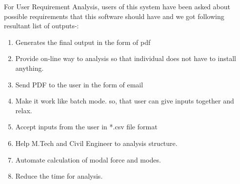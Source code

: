For User Requirement Analysis, users of this system have been asked about 
possible requirements that this software should have and we got following
resultant list of outputs-:
\begin{enumerate}
\item Generates the final output in the form of pdf
\item Provide on-line way to analysis so that individual does not have to 
install anything.
\item Send PDF to the user in the form of email
\item Make it work like batch mode. so, that user can give inputs 
together and relax.
\item Accept inputs from the user in *.csv file format
\item Help M.Tech and Civil Engineer to analysis structure.
\item Automate calculation of modal force and modes.
\item Reduce the time for analysis.
\end{enumerate}

